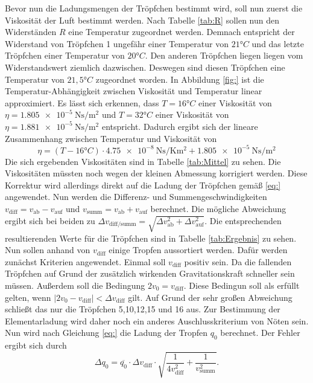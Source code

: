 \noindent Bevor nun die Ladungsmengen der Tröpfchen bestimmt wird, soll nun zuerst die Viskosität der Luft bestimmt werden.
Nach Tabelle \ref{tab:R} sollen nun den Widerständen $R$ eine Temperatur zugeordnet werden. Demnach entspricht der
Widerstand von Tröpfchen 1 ungefähr einer Temperatur von $21°C$ und das letzte Tröpfchen einer Temperatur von $20°C$. Den anderen Tröpfchen
liegen liegen vom Widerstandswert ziemlich dazwischen. Deswegen sind diesen Tröpfchen eine Temperatur von $21,5°C$ zugeordnet worden.
In Abbildung \ref{fig:} ist die Temperatur-Abhängigkeit zwischen Viskosität und Temperatur linear approximiert.
Es lässt sich erkennen, dass $T=16°C$ einer Viskosität von $\eta=\qty{1.805e-5}{\newton\second\per\meter\squared}$
und $T=32°C$ einer Viskosität von $\eta=\qty{1.881e-5}{\newton\second\per\meter\squared}$ entspricht.
Dadurch ergibt sich der lineare Zusammenhang zwischen Temperatur und Viskosität von
\begin{equation}
    \eta=(T-16°C)\cdot \qty{4.75e-8}{\newton\second\per\kelvin\meter\squared}+\qty{1.805e-5}{\newton\second\per\meter\squared}
\end{equation}
Die sich ergebenden Viskositäten sind in Tabelle \ref{tab:Mittel} zu sehen. Die Viskositäten müssten noch wegen der kleinen Abmessung
korrigiert werden. Diese Korrektur wird allerdings direkt auf die Ladung der Tröpfchen gemäß \eqref{eq:}
angewendet. Nun werden die Differenz- und Summengeschwindigkeiten $v_\text{diff}=v_\text{ab}-v_\text{auf} $ und $v_\text{summ}=v_\text{ab}+v_\text{auf}$
berechnet. Die mögliche Abweichung ergibt sich bei beiden zu $\Delta v_\text{diff/summ}=\sqrt{\Delta v_\text{ab}^2+\Delta v_\text{auf}^2}$.
Die entsprechenden resultierenden Werte für die Tröpfchen sind in Tabelle \ref{tab:Ergebnis} zu sehen.
Nun sollen anhand von $v_\text{diff}$ einige Tropfen aussortiert werden. Dafür werden zunächst Kriterien angewendet.
Einmal soll $v_\text{diff}$ positiv sein. Da die fallenden Tröpfchen auf Grund der zusätzlich wirkenden Gravitationskraft schneller sein müssen.
Außerdem soll die Bedingung $2v_0=v_\text{diff}$. Diese Bedingun soll als erfüllt gelten, wenn 
$\left|2v_0-v_\text{diff}\right|<\Delta v_\text{diff}$ gilt. Auf Grund der sehr großen Abweichung schließt das nur 
die Tröpfchen 5,10,12,15 und 16 aus. Zur Bestimmung der Elementarladung wird daher noch ein anderes Auschlusskriterium von
Nöten sein.
Nun wird nach Gleichung \eqref{eq:} die Ladung der Tropfen $q_0$ berechnet. Der Fehler ergibt sich durch
\begin{equation}
    \Delta q_0=\overline{q_0}\cdot \Delta v_\text{diff}\cdot \sqrt{\frac{1}{4v_\text{diff}^2}+\frac{1}{v_\text{summ}^2}}.
\end{equation}
